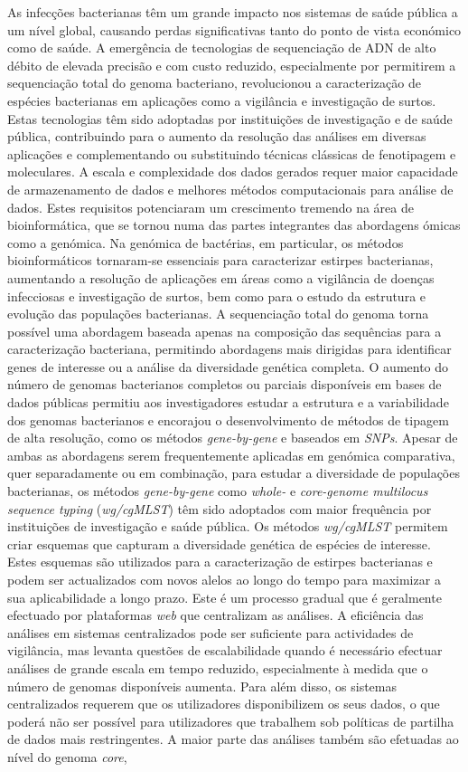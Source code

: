 As infecções bacterianas têm um grande impacto nos sistemas de saúde pública a um nível global, causando perdas significativas tanto do ponto de vista económico como de saúde. A emergência de tecnologias de sequenciação de ADN de alto débito de elevada precisão e com custo reduzido, especialmente por permitirem a sequenciação total do genoma bacteriano, revolucionou a caracterização de espécies bacterianas em aplicações como a vigilância e investigação de surtos. Estas tecnologias têm sido adoptadas por instituições de investigação e de saúde pública, contribuindo para o aumento da resolução das análises em diversas aplicações e complementando ou substituindo técnicas clássicas de fenotipagem e moleculares. A escala e complexidade dos dados gerados requer maior capacidade de armazenamento de dados e melhores métodos computacionais para análise de dados. Estes requisitos potenciaram um crescimento tremendo na área de bioinformática, que se tornou numa das partes integrantes das abordagens ómicas como a genómica. Na genómica de bactérias, em particular, os métodos bioinformáticos tornaram-se essenciais para caracterizar estirpes bacterianas, aumentando a resolução de aplicações em áreas como a vigilância de doenças infecciosas e investigação de surtos, bem como para o estudo da estrutura e evolução das populações bacterianas. A sequenciação total do genoma torna possível uma abordagem baseada apenas na composição das sequências para a caracterização bacteriana, permitindo abordagens mais dirigidas para identificar genes de interesse ou a análise da diversidade genética completa. O aumento do número de genomas bacterianos completos ou parciais disponíveis em bases de dados públicas permitiu aos investigadores estudar a estrutura e a variabilidade dos genomas bacterianos e encorajou o desenvolvimento de métodos de tipagem de alta resolução, como os métodos \textit{gene-by-gene} e baseados em \textit{SNPs}. Apesar de ambas as abordagens serem frequentemente aplicadas em genómica comparativa, quer separadamente ou em combinação, para estudar a diversidade de populações bacterianas, os métodos \textit{gene-by-gene} como \textit{whole-} e \textit{core-genome multilocus sequence typing} (\textit{wg/cgMLST}) têm sido adoptados com maior frequência por instituições de investigação e saúde pública. Os métodos \textit{wg/cgMLST} permitem criar esquemas que capturam a diversidade genética de espécies de interesse. Estes esquemas são utilizados para a caracterização de estirpes bacterianas e podem ser actualizados com novos alelos ao longo do tempo para maximizar a sua aplicabilidade a longo prazo. Este é um processo gradual que é geralmente efectuado por plataformas \textit{web} que centralizam as análises. A eficiência das análises em sistemas centralizados pode ser suficiente para actividades de vigilância, mas levanta questões de escalabilidade quando é necessário efectuar análises de grande escala em tempo reduzido, especialmente à medida que o número de genomas disponíveis aumenta. Para além disso, os sistemas centralizados requerem que os utilizadores disponibilizem os seus dados, o que poderá não ser possível para utilizadores que trabalhem sob políticas de partilha de dados mais restringentes. A maior parte das análises também são efetuadas ao nível do genoma \textit{core}, 